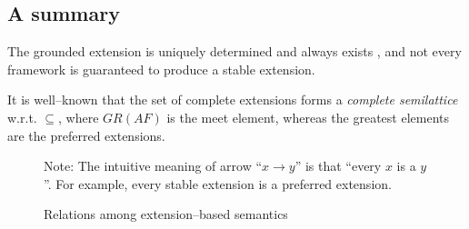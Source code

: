 \subsection{A summary}



The grounded extension is uniquely determined and always exists \cite{Dun1995},
and not every framework is guaranteed to produce a stable extension.

It is well--known that
the set of complete extensions forms a {\color{teal} \textit{complete semilattice}} w.r.t. $\subseteq$, 
where $GR(AF)$ is the meet element, 
whereas the greatest elements are the preferred extensions.


\begin{figure}[ht!]
    \vspace{1.5em}
    \centering
\caption{Relations among extension--based semantics}
\label{fig: relations among extension notions}
\vspace{1em}
\parbox{10cm}{\footnotesize
Note: The intuitive meaning of  arrow ``$x \longrightarrow y$'' is that  ``every $x$ is a $y$''.
For example, 
every stable extension is a preferred extension.
}
\end{figure}


